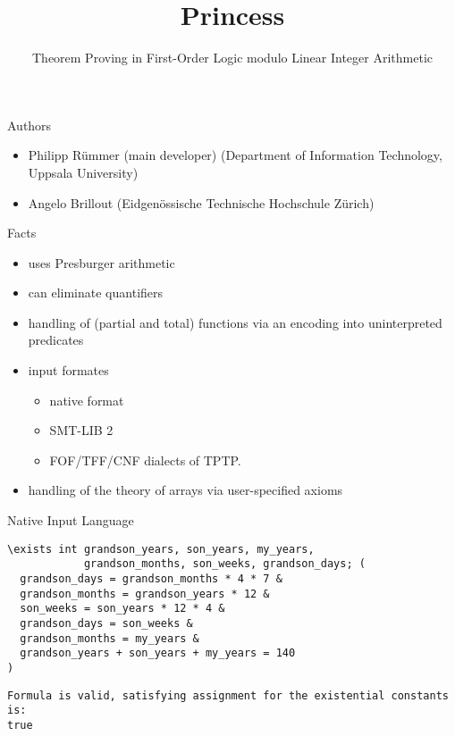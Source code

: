 \documentclass{beamer} %
\title{Princess}
\subtitle{Theorem Proving in First-Order Logic modulo Linear Integer Arithmetic}
\newenvironment{page}[1]
	{\begin{frame}[containsverbatim]{#1}}
    	{\end{frame}}
\begin{document}
\maketitle

\begin{page}{Authors}
\begin{itemize}
	\item Philipp Rümmer (main developer) (Department of Information Technology, Uppsala University)
	\item Angelo Brillout (Eidgenössische Technische Hochschule Zürich)
\end{itemize}

\end{page}
\begin{page}{Facts}
\begin{itemize}
	\item uses Presburger arithmetic
	\item can eliminate quantifiers
	\item handling of (partial and total) functions via an encoding into uninterpreted predicates
	\item input formates
	\begin{itemize}
		\item native format
		\item SMT-LIB 2 
		\item FOF/TFF/CNF dialects of TPTP.
	\end{itemize}
	\item handling of the theory of arrays via user-specified axioms
\end{itemize}

\end{page}
\begin{page}{Native Input Language}

\begin{lstlisting}
\exists int grandson_years, son_years, my_years,
            grandson_months, son_weeks, grandson_days; (
  grandson_days = grandson_months * 4 * 7 &
  grandson_months = grandson_years * 12 &
  son_weeks = son_years * 12 * 4 &
  grandson_days = son_weeks &
  grandson_months = my_years &
  grandson_years + son_years + my_years = 140
)
\end{lstlisting}
\begin{lstlisting}
Formula is valid, satisfying assignment for the existential constants is:
true
\end{lstlisting}

\end{page}
\end{document}
